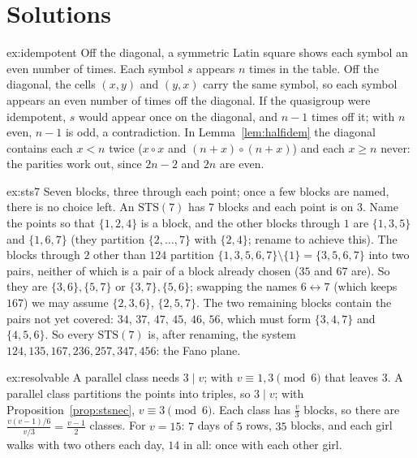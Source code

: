 \section{Solutions}

\begin{solution}{ex:idempotent}
\idea Off the diagonal, a symmetric Latin square shows each symbol an even number of times.
\writeup Each symbol $s$ appears $n$ times in the table. Off the diagonal, the cells $(x,y)$ and $(y,x)$ carry the same symbol, so each symbol appears an even number of times off the diagonal.
If the quasigroup were idempotent, $s$ would appear once on the diagonal, and $n-1$ times off it; with $n$ even, $n-1$ is odd, a contradiction. In Lemma~\ref{lem:halfidem} the diagonal contains each
$x<n$ twice ($x\circ x$ and $(n+x)\circ(n+x)$) and each $x\ge n$ never: the parities work out, since $2n-2$ and $2n$ are even.
\end{solution}

\begin{solution}{ex:sts7}
\idea Seven blocks, three through each point; once a few blocks are named, there is no choice left.
\writeup An $\mathrm{STS}(7)$ has $7$ blocks and each point is on $3$. Name the points so that $\{1,2,4\}$ is a block, and the other blocks through $1$ are $\{1,3,5\}$ and $\{1,6,7\}$ (they partition $\{2,\dots,7\}$
with $\{2,4\}$; rename to achieve this). The blocks through $2$ other than $124$ partition $\{1,3,5,6,7\}\setminus\{1\}=\{3,5,6,7\}$ into two pairs, neither of which is a pair of a block already chosen ($35$ and
$67$ are). So they are $\{3,6\},\{5,7\}$ or $\{3,7\},\{5,6\}$; swapping the names $6\leftrightarrow7$ (which keeps $167$) we may assume $\{2,3,6\}$, $\{2,5,7\}$. The two remaining blocks contain the pairs not yet
covered: $34$, $37$, $47$, $45$, $46$, $56$, which must form $\{3,4,7\}$ and $\{4,5,6\}$. So every $\mathrm{STS}(7)$ is, after renaming, the system $124,135,167,236,257,347,456$: the Fano plane.
\end{solution}

\begin{solution}{ex:resolvable}
\idea A parallel class needs $3\mid v$; with $v\equiv1,3\pmod6$ that leaves $3$.
\writeup A parallel class partitions the points into triples, so $3\mid v$; with Proposition~\ref{prop:stsnec}, $v\equiv3\pmod 6$. Each class has $\frac v3$ blocks, so there are $\frac{v(v-1)/6}{v/3}=\frac{v-1}2$
classes. For $v=15$: $7$ days of $5$ rows, $35$ blocks, and each girl walks with two others each day, $14$ in all: once with each other girl.
\end{solution}

